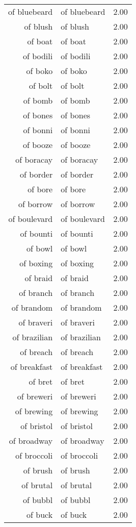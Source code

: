 \begin{table}[ht]
\begin{tabular}{rlr}
  of bluebeard & of bluebeard & 2.00 \\ 
  of blush & of blush & 2.00 \\ 
  of boat & of boat & 2.00 \\ 
  of bodili & of bodili & 2.00 \\ 
  of boko & of boko & 2.00 \\ 
  of bolt & of bolt & 2.00 \\ 
  of bomb & of bomb & 2.00 \\ 
  of bones & of bones & 2.00 \\ 
  of bonni & of bonni & 2.00 \\ 
  of booze & of booze & 2.00 \\ 
  of boracay & of boracay & 2.00 \\ 
  of border & of border & 2.00 \\ 
  of bore & of bore & 2.00 \\ 
  of borrow & of borrow & 2.00 \\ 
  of boulevard & of boulevard & 2.00 \\ 
  of bounti & of bounti & 2.00 \\ 
  of bowl & of bowl & 2.00 \\ 
  of boxing & of boxing & 2.00 \\ 
  of braid & of braid & 2.00 \\ 
  of branch & of branch & 2.00 \\ 
  of brandom & of brandom & 2.00 \\ 
  of braveri & of braveri & 2.00 \\ 
  of brazilian & of brazilian & 2.00 \\ 
  of breach & of breach & 2.00 \\ 
  of breakfast & of breakfast & 2.00 \\ 
  of bret & of bret & 2.00 \\ 
  of breweri & of breweri & 2.00 \\ 
  of brewing & of brewing & 2.00 \\ 
  of bristol & of bristol & 2.00 \\ 
  of broadway & of broadway & 2.00 \\ 
  of broccoli & of broccoli & 2.00 \\ 
  of brush & of brush & 2.00 \\ 
  of brutal & of brutal & 2.00 \\ 
  of bubbl & of bubbl & 2.00 \\ 
  of buck & of buck & 2.00 \\ 

\end{tabular}
\end{table}
